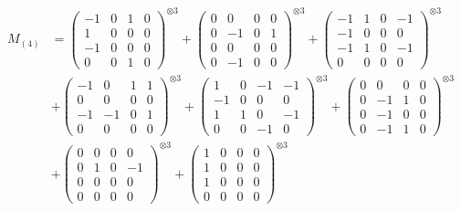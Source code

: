 \documentclass{article}
\newcommand{\Mthree}{%
    M_{(4)}
}
\begin{document}
{\footnotesize
\begin{align}
    \Mthree
    &= \label{Rs12-Rc12-Solution-Transformed-c1} \begin{pmatrix} -1 & 0 & 1 & 0 \\ 1 & 0 & 0 & 0 \\ -1 & 0 & 0 & 0 \\ 0 & 0 & 1 & 0 \end{pmatrix}^{\otimes 3} 
        + \begin{pmatrix} 0 & 0 & 0 & 0 \\ 0 & -1 & 0 & 1 \\ 0 & 0 & 0 & 0 \\ 0 & -1 & 0 & 0 \end{pmatrix}^{\otimes 3} 
        + \begin{pmatrix} -1 & 1 & 0 & -1 \\ -1 & 0 & 0 & 0 \\ -1 & 1 & 0 & -1 \\ 0 & 0 & 0 & 0 \end{pmatrix}^{\otimes 3} \\
    &+ \label{Rs12-Rc12-Solution-Transformed-c4} \begin{pmatrix} -1 & 0 & 1 & 1 \\ 0 & 0 & 0 & 0 \\ -1 & -1 & 0 & 1 \\ 0 & 0 & 0 & 0 \end{pmatrix}^{\otimes 3} 
        + \begin{pmatrix} 1 & 0 & -1 & -1 \\ -1 & 0 & 0 & 0 \\ 1 & 1 & 0 & -1 \\ 0 & 0 & -1 & 0 \end{pmatrix}^{\otimes 3} 
        + \begin{pmatrix} 0 & 0 & 0 & 0 \\ 0 & -1 & 1 & 0 \\ 0 & -1 & 0 & 0 \\ 0 & -1 & 1 & 0 \end{pmatrix}^{\otimes 3} \\
    &+ \label{Rs12-Rc12-Solution-Transformed-c7} \begin{pmatrix} 0 & 0 & 0 & 0 \\ 0 & 1 & 0 & -1 \\ 0 & 0 & 0 & 0 \\ 0 & 0 & 0 & 0 \end{pmatrix}^{\otimes 3} 
        + \begin{pmatrix} 1 & 0 & 0 & 0 \\ 1 & 0 & 0 & 0 \\ 1 & 0 & 0 & 0 \\ 0 & 0 & 0 & 0 \end{pmatrix}^{\otimes 3} 

\end{align}}
\end{document}
